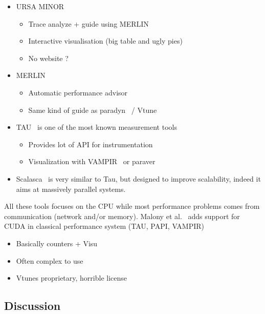 \begin{itemize}
\begin{itemize}
        \end{itemize}
    \item URSA MINOR~\cite{Park00Supporting}
        \begin{itemize}
            \item Trace analyze + guide using MERLIN\cite{Kim01Performance}
            \item Interactive visualisation (big table and ugly pies)
            \item No website ?
        \end{itemize}
    \item MERLIN~\cite{Kim01Performance}
        \begin{itemize}
            \item Automatic performance advisor
            \item Same kind of guide as paradyn~\cite{Miller95Paradyn} /
                Vtune~\cite{Reinders05VTune}
        \end{itemize}
    \item TAU~\cite{Shende06Tau} is one of the most known measurement tools
        \begin{itemize}
            \item Provides lot of API for instrumentation
            \item Visualization with
                VAMPIR~\cite{Nagel96VAMPIR} or paraver
        \end{itemize}
    \item Scalasca~\cite{Geimer10Scalasca} is very similar to Tau, but
        designed to improve scalability, indeed it aims at massively parallel
        systems.
\end{itemize}

All these tools focuses on the CPU while most performance problems comes from
communication (network and/or memory).
Malony et al.~\cite{Malony11Parallel} adds support for CUDA in classical
performance system (TAU, PAPI, VAMPIR)

\begin{itemize}
    \item Basically counters + Visu
    \item Often complex to use
    \item Vtunes proprietary, horrible license
\end{itemize}

\subsection{Discussion}

